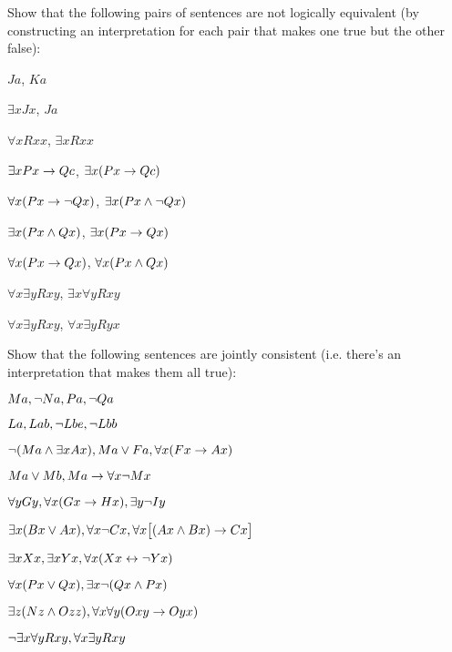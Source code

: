 \problempart
\label{pr.NotEquiv}
Show that the following pairs of sentences are not logically equivalent (by constructing an interpretation for each pair that makes one true but the other false):
\begin{earg}
\item $Ja$, $Ka$
\item $\exists x Jx$, $Ja$
\item $\forall x Rxx$, $\exists x Rxx$
\item $\exists x Px \rightarrow Qc$, $\exists x (Px \rightarrow Qc)$
\item $\forall x(Px \rightarrow \neg Qx)$, $\exists x(Px \wedge \neg Qx)$
\item $\exists x(Px \wedge Qx)$, $\exists x(Px \rightarrow Qx)$
\item $\forall x(Px\rightarrow Qx)$, $\forall x(Px \wedge Qx)$
\item $\forall x\exists y Rxy$, $\exists x\forall y Rxy$
\item $\forall x\exists y Rxy$, $\forall x\exists y Ryx$
\end{earg}



\problempart
Show that the following sentences are jointly consistent (i.e. there's an interpretation that makes them all true):
\begin{earg}
\item $Ma, \neg Na, Pa, \neg Qa$
\item $La, Lab, \neg Lbe, \neg Lbb$
\item $\neg (Ma \wedge \exists x Ax), Ma \vee Fa, \forall x(Fx \rightarrow Ax)$
\item $Ma \vee Mb, Ma \rightarrow \forall x \neg Mx$
\item $\forall y Gy, \forall x (Gx \rightarrow Hx), \exists y \neg Iy$
\item $\exists x(Bx \vee Ax), \forall x \neg Cx, \forall x\bigl[(Ax \wedge Bx) \rightarrow Cx\bigr]$
\item $\exists x Xx, \exists x Yx, \forall x(Xx \leftrightarrow \neg Yx)$
\item $\forall x(Px \vee Qx), \exists x\neg(Qx \wedge Px)$
\item $\exists z(Nz \wedge Ozz), \forall x\forall y(Oxy \rightarrow Oyx)$
\item $\neg \exists x \forall y Rxy, \forall x \exists y Rxy$
\end{earg}


